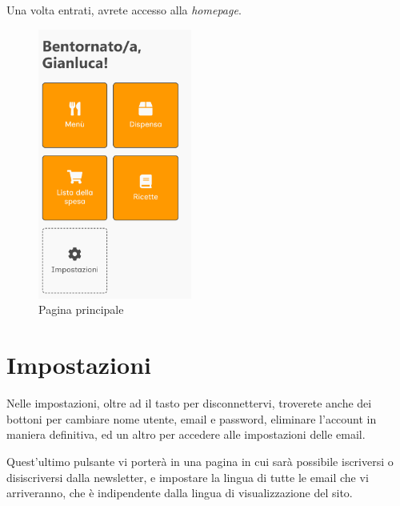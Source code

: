 \documentclass[12pt, a4paper]{report}
\begin{document}
    Una volta entrati, avrete accesso alla \emph{homepage}.

    \begin{figure}[H]
        \centering
        \includegraphics[width=0.45\textwidth]{assets/it/home.png}
        \caption{Pagina principale}
    \end{figure}

    \section{Impostazioni}

    Nelle impostazioni, oltre ad il tasto per disconnettervi, troverete anche dei bottoni per cambiare nome utente, email e password, eliminare
    l'account in maniera definitiva, ed un altro per accedere alle impostazioni delle email.

	\label{newsletter}Quest'ultimo pulsante vi porterà in una pagina in cui sarà possibile iscriversi o disiscriversi dalla newsletter, e impostare
	la lingua di tutte le email che vi arriveranno, che è indipendente dalla lingua di visualizzazione del sito.
\end{document}
